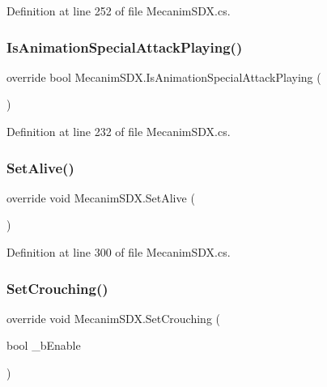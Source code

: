 Definition at line 252 of file Mecanim\+S\+D\+X.\+cs.

\mbox{\label{class_mecanim_s_d_x_ab53b82df62046df779432b2777526e69}} 
\subsubsection{\texorpdfstring{IsAnimationSpecialAttackPlaying()}{IsAnimationSpecialAttackPlaying()}}
{\footnotesize\ttfamily override bool Mecanim\+S\+D\+X.\+Is\+Animation\+Special\+Attack\+Playing (\begin{DoxyParamCaption}{ }\end{DoxyParamCaption})}



Definition at line 232 of file Mecanim\+S\+D\+X.\+cs.

\mbox{\label{class_mecanim_s_d_x_a577be9ed10bcdc018f26ff5134e621d3}} 
\subsubsection{\texorpdfstring{SetAlive()}{SetAlive()}}
{\footnotesize\ttfamily override void Mecanim\+S\+D\+X.\+Set\+Alive (\begin{DoxyParamCaption}{ }\end{DoxyParamCaption})}



Definition at line 300 of file Mecanim\+S\+D\+X.\+cs.

\mbox{\label{class_mecanim_s_d_x_a8e52240230b2681407d066978ad72b57}} 
\subsubsection{\texorpdfstring{SetCrouching()}{SetCrouching()}}
{\footnotesize\ttfamily override void Mecanim\+S\+D\+X.\+Set\+Crouching (\begin{DoxyParamCaption}\item[{bool}]{\+\_\+b\+Enable }\end{DoxyParamCaption})}



